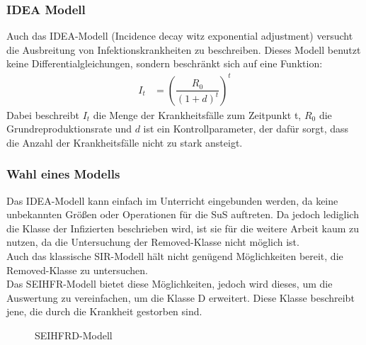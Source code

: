 \subsubsection{IDEA Modell}
\ellen
Auch das IDEA-Modell (Incidence decay witz exponential adjustment) versucht die Ausbreitung von Infektionskrankheiten zu beschreiben. Dieses Modell benutzt keine Differentialgleichungen, sondern beschränkt sich auf eine Funktion:\\
\begin{align}
I_t &=(\dfrac{R_0}{(1+d)^t})^t
\end{align}
Dabei beschreibt $I_t$ die Menge der Krankheitsfälle zum Zeitpunkt t, $R_0$ die Grundreproduktionsrate und $d$ ist ein Kontrollparameter, der dafür sorgt, dass die Anzahl der Krankheitsfälle nicht zu stark ansteigt. 
\subsubsection{Wahl eines Modells}
Das IDEA-Modell kann einfach im Unterricht eingebunden werden, da keine unbekannten Größen oder Operationen für die SuS auftreten. Da jedoch lediglich die Klasse der Infizierten beschrieben wird, ist sie für die weitere Arbeit kaum zu nutzen, da die Untersuchung der Removed-Klasse nicht möglich ist.\\
 Auch das klassische SIR-Modell hält nicht genügend Möglichkeiten bereit, die Removed-Klasse zu untersuchen.\\
  Das SEIHFR-Modell bietet diese Möglichkeiten, jedoch wird dieses, um die Auswertung zu vereinfachen, um die Klasse D erweitert. Diese Klasse beschreibt jene, die durch die Krankheit gestorben sind. 
  \begin{figure}
\begin{center}
\end{center}
\caption{SEIHFRD-Modell}
\end{figure}
